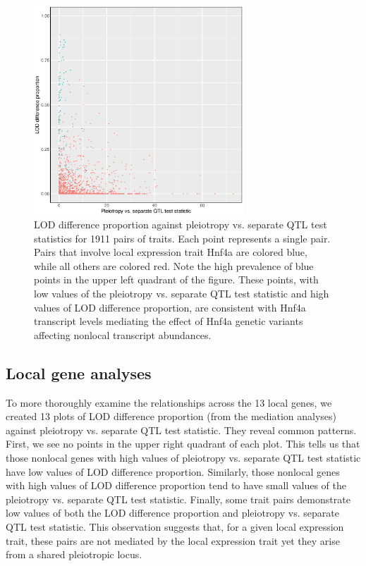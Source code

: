 \documentclass{article}
\begin{document}
\begin{figure}
    \centering
    \includegraphics[width = 0.7\textwidth]{../Rmd/lod-diff-prop-v-lrt.eps}
    \caption{LOD difference proportion against pleiotropy vs. separate QTL test statistics for 1911 pairs of traits. Each point represents a single pair. Pairs that involve local expression trait Hnf4a are colored blue, while all others are colored red. Note the high prevalence of blue points in the upper left quadrant of the figure. These points, with low values of the pleiotropy vs. separate QTL test statistic and high values of LOD difference proportion, are consistent with Hnf4a transcript levels mediating the effect of Hnf4a genetic variants affecting nonlocal transcript abundances.}
    \label{fig:lod-diff-prop-v-lrt-all}
\end{figure}

\subsection{Local gene analyses}

To more thoroughly examine the relationships across the 13 local genes, we created 13 plots of LOD difference proportion (from the mediation analyses) against pleiotropy vs. separate QTL test statistic. They reveal common patterns. First, we see no points in the upper right quadrant of each plot. This tells us that those nonlocal genes with high values of pleiotropy vs. separate QTL test statistic have low values of LOD difference proportion. Similarly, those nonlocal genes with high values of LOD difference proportion tend to have small values of the pleiotropy vs. separate QTL test statistic. Finally, some trait pairs demonstrate low values of both the LOD difference proportion and pleiotropy vs. separate QTL test statistic. This observation suggests that, for a given local expression trait, these pairs are not mediated by the local expression trait yet they arise from a shared pleiotropic locus. 
\end{document}
